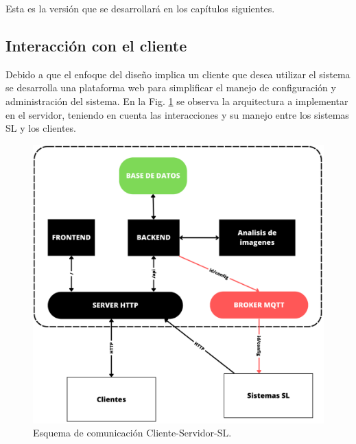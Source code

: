 Esta es la versión que se desarrollará en los capítulos siguientes.

\subsection{Interacción con el cliente}

Debido a que el enfoque del diseño implica un cliente que desea utilizar el sistema se desarrolla una plataforma web para simplificar el manejo de configuración y administración del sistema. En la Fig. \ref{fig:esquema-cliente-servidor-sl} se observa la arquitectura a implementar en el servidor, teniendo en cuenta las interacciones y su manejo entre los sistemas SL y los clientes.
\begin{figure}
    \centering
    \includegraphics[width=.4\textwidth]{imgs/server-clientes-barreras.png}
    \caption{Esquema de comunicación Cliente-Servidor-SL.}
    \label{fig:esquema-cliente-servidor-sl}
\end{figure}

